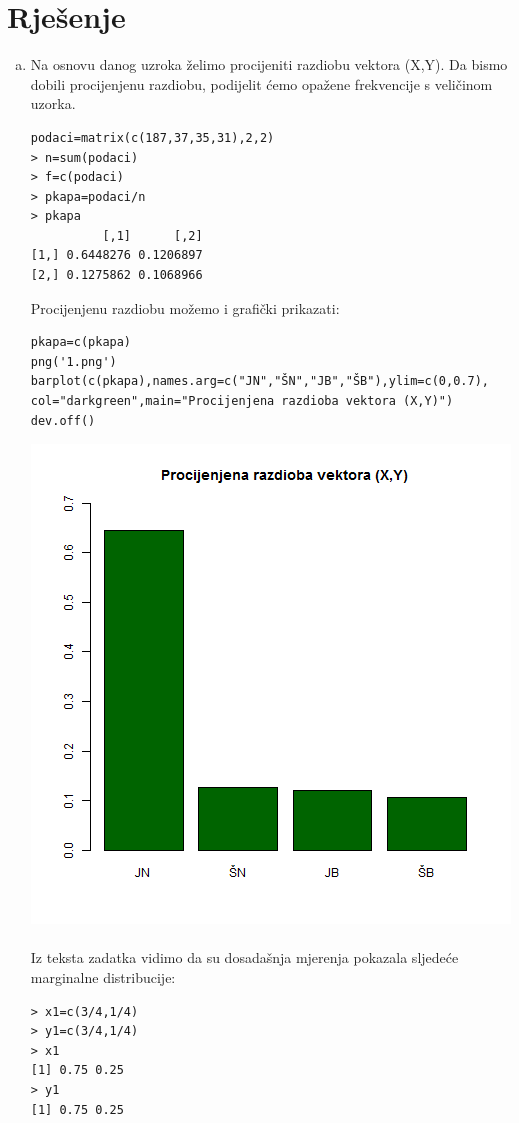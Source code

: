 \documentclass[11pt]{article}
\begin{document}
\section*{Rješenje}
\begin{enumerate}[(a)]
\item Na osnovu danog uzroka želimo procijeniti razdiobu vektora (X,Y). Da bismo dobili procijenjenu razdiobu, podijelit ćemo opažene frekvencije s veličinom uzorka.
\begin{verbatim}
podaci=matrix(c(187,37,35,31),2,2)
> n=sum(podaci)
> f=c(podaci)
> pkapa=podaci/n
> pkapa
          [,1]      [,2]
[1,] 0.6448276 0.1206897
[2,] 0.1275862 0.1068966

\end{verbatim}
Procijenjenu razdiobu možemo i grafički prikazati:
\begin{verbatim}
pkapa=c(pkapa)
png('1.png')
barplot(c(pkapa),names.arg=c("JN","ŠN","JB","ŠB"),ylim=c(0,0.7),
col="darkgreen",main="Procijenjena razdioba vektora (X,Y)")
dev.off()
\end{verbatim}
\includegraphics[scale=0.45]{1.png}\\\\
Iz teksta zadatka vidimo da su dosadašnja mjerenja pokazala sljedeće marginalne distribucije:
\begin{verbatim}
> x1=c(3/4,1/4)
> y1=c(3/4,1/4)
> x1
[1] 0.75 0.25
> y1
[1] 0.75 0.25
\end{verbatim}

\end{enumerate}
\end{document}
